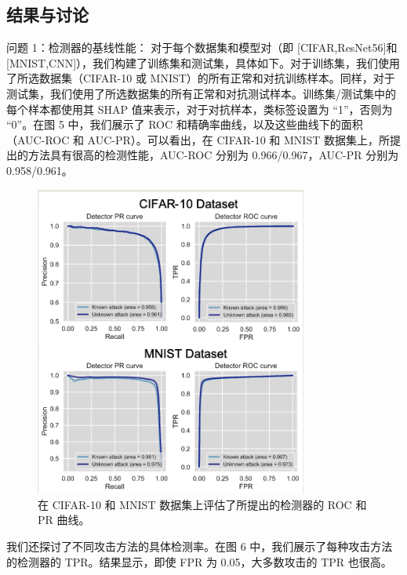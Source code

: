 \documentclass[12pt, a4paper]{ctexart} %
\begin{document}
\subsection{结果与讨论}
问题 1：检测器的基线性能： 对于每个数据集和模型对（即 [CIFAR,ResNet56]和 [MNIST,CNN]），我们构建了训练集和测试集，具体如下。对于训练集，我们使用了所选数据集（CIFAR-10 或 MNIST）的所有正常和对抗训练样本。同样，对于测试集，我们使用了所选数据集的所有正常和对抗测试样本。训练集/测试集中的每个样本都使用其 SHAP 值来表示，对于对抗样本，类标签设置为 “1”，否则为 “0”。在图 5 中，我们展示了 ROC 和精确率曲线，以及这些曲线下的面积（AUC-ROC 和 AUC-PR）。可以看出，在 CIFAR-10 和 MNIST 数据集上，所提出的方法具有很高的检测性能，AUC-ROC 分别为 0.966/0.967，AUC-PR 分别为 0.958/0.961。
\begin{figure}[H]
    \centering
    \includegraphics[width=0.8\textwidth]{img/adversaries_7.png}
    \caption{在 CIFAR-10 和 MNIST 数据集上评估了所提出的检测器的 ROC 和 PR 曲线。}
\end{figure}
我们还探讨了不同攻击方法的具体检测率。在图 6 中，我们展示了每种攻击方法的检测器的 TPR。结果显示，即使 FPR 为 0.05，大多数攻击的 TPR 也很高。
\end{document}
